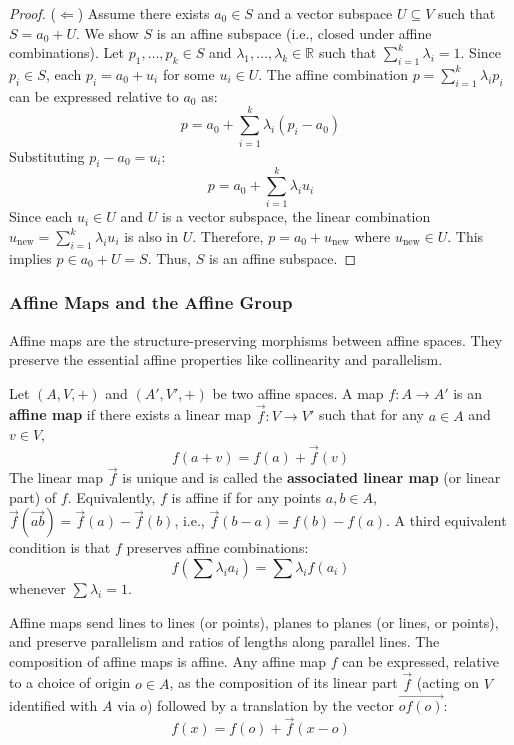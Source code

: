 \begin{proof}
($\Leftarrow$) Assume there exists $a_0 \in S$ and a vector subspace $U \subseteq V$ such that $S = a_0 + U$. We show $S$ is an affine subspace (i.e., closed under affine combinations).
Let $p_1, \dots, p_k \in S$ and $\lambda_1, \dots, \lambda_k \in \mathbb{R}$ such that $\sum_{i=1}^k \lambda_i = 1$.
Since $p_i \in S$, each $p_i = a_0 + u_i$ for some $u_i \in U$.
The affine combination $p = \sum_{i=1}^k \lambda_i p_i$ can be expressed relative to $a_0$ as:
\[ p = a_0 + \sum_{i=1}^k \lambda_i (p_i - a_0) \]
Substituting $p_i - a_0 = u_i$:
\[ p = a_0 + \sum_{i=1}^k \lambda_i u_i \]
Since each $u_i \in U$ and $U$ is a vector subspace, the linear combination $u_{\text{new}} = \sum_{i=1}^k \lambda_i u_i$ is also in $U$.
Therefore, $p = a_0 + u_{\text{new}}$ where $u_{\text{new}} \in U$. This implies $p \in a_0 + U = S$.
Thus, $S$ is an affine subspace.
\end{proof}

\subsubsection{Affine Maps and the Affine Group}

Affine maps are the structure-preserving morphisms between affine spaces. They preserve the essential affine properties like collinearity and parallelism.

\begin{definition} \label{def:affine_map}
Let $(A, V, +)$ and $(A', V', +)$ be two affine spaces. A map $f: A \to A'$ is an \textbf{affine map} if there exists a linear map $\vec{f}: V \to V'$ such that for any $a \in A$ and $v \in V$,
\[
f(a + v) = f(a) + \vec{f}(v)
\]
The linear map $\vec{f}$ is unique and is called the \textbf{associated linear map} (or linear part) of $f$. Equivalently, $f$ is affine if for any points $a, b \in A$, $\vec{f}(\vec{ab}) = \vec{f}(a) - \vec{f}(b)$, i.e., $\vec{f}(b - a) = f(b) - f(a)$.
A third equivalent condition is that $f$ preserves affine combinations: 
\[
f\left( \sum \lambda_i a_i \right) = \sum \lambda_i f(a_i)
\]
whenever $\sum \lambda_i = 1$.
\end{definition}

Affine maps send lines to lines (or points), planes to planes (or lines, or points), and preserve parallelism and ratios of lengths along parallel lines. The composition of affine maps is affine. Any affine map $f$ can be expressed, relative to a choice of origin $o \in A$, as the composition of its linear part $\vec{f}$ (acting on $V$ identified with $A$ via $o$) followed by a translation by the vector $\vec{of(o)}$:
\[
f(x) = f(o) + \vec{f}(x - o)
\]

